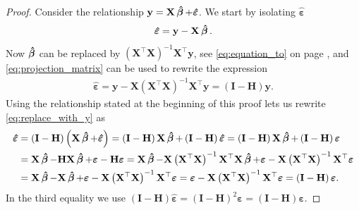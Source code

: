 \begin{proof}
    Consider the relationship $\mathbf{y} = \mathbf{X}\operatorname{\boldsymbol{\hat{\beta}}} + \boldsymbol{\hat{\varepsilon}}$.
    We start by isolating $\boldsymbol{\hat{\varepsilon}}$
    \begin{align*}
        \boldsymbol{\hat{\varepsilon}} = \mathbf{y} - \mathbf{X}\operatorname{\boldsymbol{\hat{\beta}}}.
    \end{align*}
    Now $\operatorname{\boldsymbol{\hat{\beta}}}$ can be replaced by $\left(\mathbf{X}^\top\mathbf{X}\right)^{-1}\mathbf{X}^\top\mathbf{y}$, see \eqref{eq:equation_to} on page \pageref{eq:equation_to}, and \eqref{eq:projection_matrix} can be used to rewrite the expression 
    \begin{align}
        \hat{\boldsymbol{\varepsilon}} = \mathbf{y} - \mathbf{X}\left(\mathbf{X}^\top\mathbf{X}\right)^{-1}\mathbf{X}^\top\mathbf{y}
        = \left(\mathbf{I} - \mathbf{H}\right)\mathbf{y}. \label{eq:replace_with_y}
    \end{align}
    Using the relationship stated at the beginning of this proof lets us rewrite \eqref{eq:replace_with_y} as
    \begin{align*}
        \boldsymbol{\hat{\varepsilon}} &= \left(\mathbf{I} - \mathbf{H}\right)\left(\mathbf{X}\operatorname{\boldsymbol{\hat{\beta}}} + \boldsymbol{\hat{\varepsilon}}\right) 
        = \left(\mathbf{I} - \mathbf{H}\right)\mathbf{X}\operatorname{\boldsymbol{\hat{\beta}}} + \left(\mathbf{I} - \mathbf{H}\right)\boldsymbol{\hat{\varepsilon}}
        = \left(\mathbf{I} - \mathbf{H}\right)\mathbf{X}\operatorname{\boldsymbol{\hat{\beta}}} + \left(\mathbf{I} - \mathbf{H}\right)\boldsymbol{\varepsilon}\\
        &= \mathbf{X}\operatorname{\boldsymbol{\hat{\beta}}} - \mathbf{H}\mathbf{X}\operatorname{\boldsymbol{\hat{\beta}}} + \boldsymbol{\varepsilon} - \mathbf{H}\boldsymbol{\varepsilon}
        = \mathbf{X}\operatorname{\boldsymbol{\hat{\beta}}} - \mathbf{X}\left(\mathbf{X}^\top\mathbf{X}\right)^{-1}\mathbf{X}^\top\mathbf{X}\operatorname{\boldsymbol{\hat{\beta}}} + \boldsymbol{\varepsilon} - \mathbf{X}\left(\mathbf{X}^\top\mathbf{X}\right)^{-1}\mathbf{X}^\top\boldsymbol{\varepsilon} \\
        &= \mathbf{X}\operatorname{\boldsymbol{\hat{\beta}}} - \mathbf{X}\operatorname{\boldsymbol{\hat{\beta}}} + \boldsymbol{\varepsilon} - \mathbf{X}\left(\mathbf{X}^\top\mathbf{X}\right)^{-1}\mathbf{X}^\top\boldsymbol{\varepsilon} 
        = \boldsymbol{\varepsilon} - \mathbf{X}\left(\mathbf{X}^\top\mathbf{X}\right)^{-1}\mathbf{X}^\top\boldsymbol{\varepsilon} = \left(\mathbf{I} - \mathbf{H}\right)\boldsymbol{\varepsilon}.
    \end{align*}
    In the third equality we use $(\textbf{I} - \textbf{H})\hat{\boldsymbol{\varepsilon}} = (\textbf{I} - \textbf{H})^2\boldsymbol{\varepsilon} = (\textbf{I} - \textbf{H})\boldsymbol{\varepsilon}$.

\end{proof}
